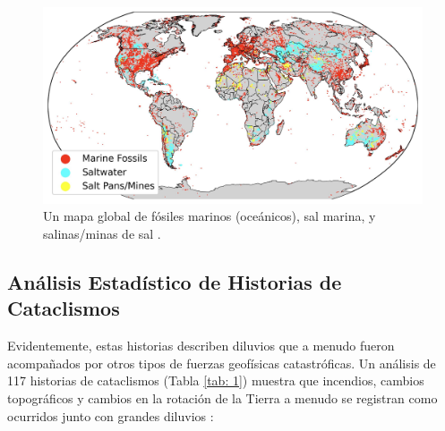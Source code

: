 \documentclass[10pt,twocolumn,letterpaper]{article}
\begin{document}
\begin{figure}[t]
\begin{center}
\includegraphics[width=1\textwidth]{marine.jpg}
\end{center}
   \caption{Un mapa global de fósiles marinos (oceánicos), sal marina, y salinas/minas de sal \cite{15,16,86,87}.}

   \label{fig:2}
\end{figure}

\subsection{Análisis Estadístico de Historias de Cataclismos}

Evidentemente, estas historias describen diluvios que a menudo fueron acompañados por otros tipos de fuerzas geofísicas catastróficas. Un análisis de 117 historias de cataclismos (Tabla \ref{tab: 1}) muestra que incendios, cambios topográficos y cambios en la rotación de la Tierra a menudo se registran como ocurridos junto con grandes diluvios \cite{14}:
\end{document}

